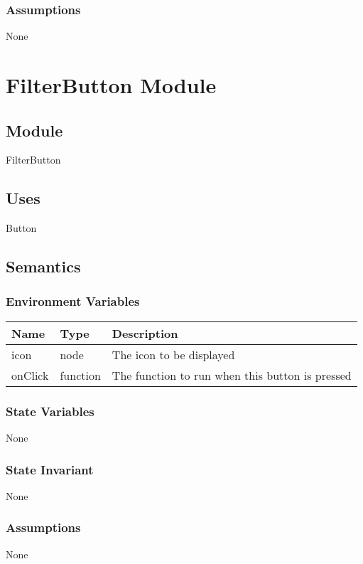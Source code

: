\documentclass[12pt]{article}
\begin{document}
\subsubsection{Assumptions}
None

\newpage

\section{FilterButton Module}

\subsection{Module}
FilterButton

\subsection{Uses}
Button

\subsection{Semantics}
\subsubsection{Environment Variables}
\begin{tabular}{| l | l | p{10cm} |}
    \hline
    \textbf{Name} & \textbf{Type} & \textbf{Description}\\ \hline
    icon & node & The icon to be displayed\\ \hline
    onClick & function & The function to run when this button is pressed\\ \hline
\end{tabular}

\subsubsection{State Variables}
None

\subsubsection{State Invariant}
None

\subsubsection{Assumptions}
None

\newpage
\end{document}
